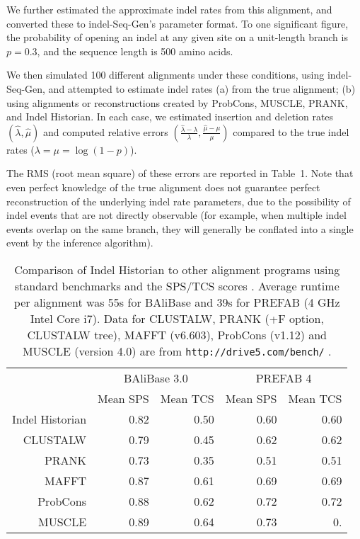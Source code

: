 \documentclass{bioinfo}
\begin{document}
We further estimated the approximate indel rates from this alignment, and converted these to indel-Seq-Gen's parameter format.
To one significant figure, the probability of opening an indel at any given site on a unit-length branch is $p=0.3$, and the sequence length is 500 amino acids.

We then simulated 100 different alignments under these conditions, using indel-Seq-Gen, and attempted to estimate indel rates
(a) from the true alignment; (b) using alignments or reconstructions created by ProbCons, MUSCLE, PRANK, and Indel Historian.
In each case, we estimated insertion and deletion rates $(\hat{\lambda},\hat{\mu})$ and computed relative errors $(\frac{\hat{\lambda}-\lambda}{\lambda},\frac{\hat{\mu}-\mu}{\mu})$
compared to the true indel rates ($\lambda = \mu = \log(1-p)$).

The RMS (root mean square) of these errors are reported in Table~1.
Note that even perfect knowledge of the true alignment does not guarantee perfect reconstruction of the underlying indel rate parameters,
due to the possibility of indel events that are not directly observable (for example, when multiple indel events overlap on the same branch,
they will generally be conflated into a single event by the inference algorithm).

\begin{table}
  \begin{tabular}{r|rr|rr}
    & \multicolumn{2}{c|}{BAliBase 3.0} & \multicolumn{2}{c}{PREFAB 4} \\
    & Mean SPS & Mean TCS & Mean SPS & Mean TCS \\
    \hline
Indel Historian & 0.82 & 0.50 & 0.60 & 0.60 \\
CLUSTALW & 0.79 & 0.45 & 0.62 & 0.62 \\
PRANK & 0.73 & 0.35 & 0.51 & 0.51 \\
MAFFT & 0.87 & 0.61 & 0.69 & 0.69 \\
ProbCons & 0.88 & 0.62 & 0.72 & 0.72 \\
MUSCLE & 0.89 & 0.64 & 0.73 & 0.\end{tabular}
  \caption{
    Comparison of Indel Historian to other alignment programs using standard benchmarks
    and the SPS/TCS scores \citep{ThompsonEtAl2005}.
    Average runtime per alignment was 55s for BAliBase and 39s for PREFAB (4 GHz Intel Core i7).
    Data for CLUSTALW, PRANK (+F option, CLUSTALW tree), MAFFT (v6.603), ProbCons (v1.12) and MUSCLE (version 4.0) are from {\tt http://drive5.com/bench/} \citep{Edgar2010}.
  }
\end{table}
\end{document}
